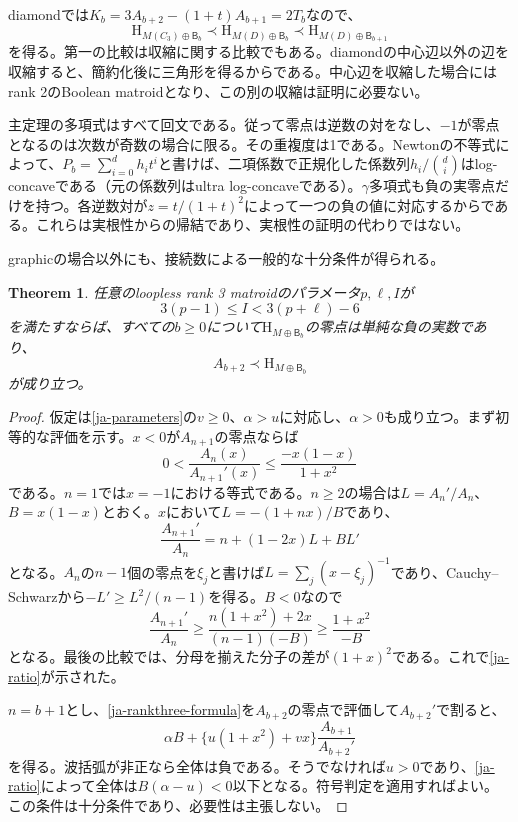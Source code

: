 \documentclass[12pt]{amsart}
\newtheorem{thm}{Theorem}[section]
\theoremstyle{definition}
\theoremstyle{remark}
\numberwithin{equation}{section}
\newcommand{\HCh}{\mathrm{H}}
\newcommand{\Bmat}{\mathsf{B}}
\begin{document}
diamondでは$K_b=3A_{b+2}-(1+t)A_{b+1}=2T_b$なので、
\begin{equation}\label{ja-diamond-interlace}
 \HCh_{M(C_3)\oplus\Bmat_b}\prec
 \HCh_{M(D)\oplus\Bmat_b}\prec
 \HCh_{M(D)\oplus\Bmat_{b+1}}
\end{equation}
を得る。第一の比較は収縮に関する比較でもある。diamondの中心辺以外の辺を収縮すると、簡約化後に三角形を得るからである。中心辺を収縮した場合にはrank 2のBoolean matroidとなり、この別の収縮は証明に必要ない。

主定理の多項式はすべて回文である。従って零点は逆数の対をなし、$-1$が零点となるのは次数が奇数の場合に限る。その重複度は1である。Newtonの不等式によって、$P_b=\sum_{i=0}^d h_it^i$と書けば、二項係数で正規化した係数列$h_i/\binom di$はlog-concaveである（元の係数列はultra log-concaveである）。$\gamma$多項式も負の実零点だけを持つ。各逆数対が$z=t/(1+t)^2$によって一つの負の値に対応するからである。これらは実根性からの帰結であり、実根性の証明の代わりではない。

graphicの場合以外にも、接続数による一般的な十分条件が得られる。
\begin{samepage}
\begin{thm}\label{ja-incidence-criterion}
任意のloopless rank 3 matroidのパラメータ$p,\ell,I$が
\[
 3(p-1)\leq I<3(p+\ell)-6
\]
を満たすならば、すべての$b\geq0$について$\HCh_{M\oplus\Bmat_b}$の零点は単純な負の実数であり、
\[
 A_{b+2}\prec\HCh_{M\oplus\Bmat_b}
\]
が成り立つ。
\end{thm}
\end{samepage}
\begin{proof}
仮定は\eqref{ja-parameters}の$v\geq0$、$\alpha>u$に対応し、$\alpha>0$も成り立つ。まず初等的な評価を示す。$x<0$が$A_{n+1}$の零点ならば
\begin{equation}\label{ja-ratio}
 0<\frac{A_n(x)}{A_{n+1}'(x)}\leq\frac{-x(1-x)}{1+x^2}
\end{equation}
である。$n=1$では$x=-1$における等式である。$n\geq2$の場合は$L=A_n'/A_n$、$B=x(1-x)$とおく。$x$において$L=-(1+nx)/B$であり、
\[
 \frac{A_{n+1}'}{A_n}=n+(1-2x)L+BL'
\]
となる。$A_n$の$n-1$個の零点を$\xi_j$と書けば$L=\sum_j(x-\xi_j)^{-1}$であり、Cauchy--Schwarzから$-L'\geq L^2/(n-1)$を得る。$B<0$なので
\[
 \frac{A_{n+1}'}{A_n}\geq
 \frac{n(1+x^2)+2x}{(n-1)(-B)}
 \geq\frac{1+x^2}{-B}
\]
となる。最後の比較では、分母を揃えた分子の差が$(1+x)^2$である。これで\eqref{ja-ratio}が示された。

$n=b+1$とし、\eqref{ja-rankthree-formula}を$A_{b+2}$の零点で評価して$A_{b+2}'$で割ると、
\[
 \alpha B+\{u(1+x^2)+vx\}\frac{A_{b+1}}{A_{b+2}'}
\]
を得る。波括弧が非正なら全体は負である。そうでなければ$u>0$であり、\eqref{ja-ratio}によって全体は$B(\alpha-u)<0$以下となる。符号判定を適用すればよい。この条件は十分条件であり、必要性は主張しない。
\end{proof}
\end{document}
